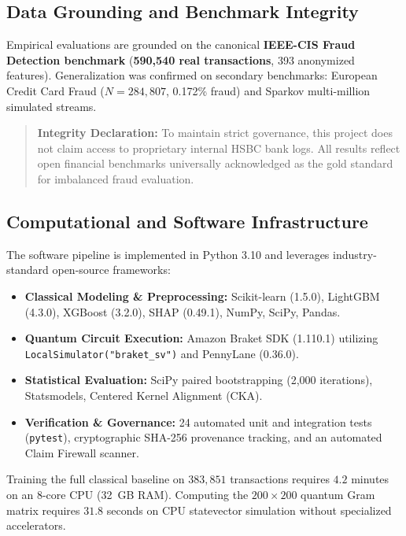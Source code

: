 \documentclass[10pt,a4paper]{article}
\begin{document}
\subsection{Data Grounding and Benchmark Integrity}
Empirical evaluations are grounded on the canonical \textbf{IEEE-CIS Fraud Detection benchmark} (\textbf{590,540 real transactions}, 393 anonymized features). Generalization was confirmed on secondary benchmarks: European Credit Card Fraud ($N=284,807$, 0.172\% fraud) and Sparkov multi-million simulated streams.
\begin{quote}
\footnotesize\textbf{Integrity Declaration:} To maintain strict governance, this project does not claim access to proprietary internal HSBC bank logs. All results reflect open financial benchmarks universally acknowledged as the gold standard for imbalanced fraud evaluation.
\end{quote}

\subsection{Computational and Software Infrastructure}
The software pipeline is implemented in Python 3.10 and leverages industry-standard open-source frameworks:
\begin{itemize}[leftmargin=*,itemsep=0.2pt,topsep=1pt]
\item \textbf{Classical Modeling \& Preprocessing:} Scikit-learn (1.5.0), LightGBM (4.3.0), XGBoost (3.2.0), SHAP (0.49.1), NumPy, SciPy, Pandas.
\item \textbf{Quantum Circuit Execution:} Amazon Braket SDK (1.110.1) utilizing \texttt{LocalSimulator("braket\_sv")} and PennyLane (0.36.0).
\item \textbf{Statistical Evaluation:} SciPy paired bootstrapping (2,000 iterations), Statsmodels, Centered Kernel Alignment (CKA).
\item \textbf{Verification \& Governance:} 24 automated unit and integration tests (\texttt{pytest}), cryptographic SHA-256 provenance tracking, and an automated Claim Firewall scanner.
\end{itemize}
Training the full classical baseline on $383,851$ transactions requires $4.2$ minutes on an 8-core CPU (32~GB RAM). Computing the $200 \times 200$ quantum Gram matrix requires $31.8$ seconds on CPU statevector simulation without specialized accelerators.
\end{document}
